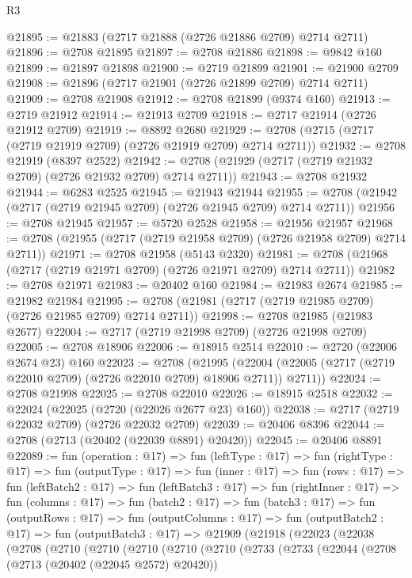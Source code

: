 \begin{lexlean}{R3}
\begin{coremodule}
@21895 := @21883 (@2717 @21888 (@2726 @21886 @2709) @2714 @2711)
@21896 := @2708 @21895
@21897 := @2708 @21886
@21898 := @9842 @160
@21899 := @21897 @21898
@21900 := @2719 @21899
@21901 := @21900 @2709
@21908 := @21896 (@2717 @21901 (@2726 @21899 @2709) @2714 @2711)
@21909 := @2708 @21908
@21912 := @2708 @21899 (@9374 @160)
@21913 := @2719 @21912
@21914 := @21913 @2709
@21918 := @2717 @21914 (@2726 @21912 @2709)
@21919 := @8892 @2680
@21929 := @2708 (@2715 (@2717 (@2719 @21919 @2709) (@2726 @21919 @2709) @2714 @2711))
@21932 := @2708 @21919 (@8397 @2522)
@21942 := @2708 (@21929 (@2717 (@2719 @21932 @2709) (@2726 @21932 @2709) @2714 @2711))
@21943 := @2708 @21932
@21944 := @6283 @2525
@21945 := @21943 @21944
@21955 := @2708 (@21942 (@2717 (@2719 @21945 @2709) (@2726 @21945 @2709) @2714 @2711))
@21956 := @2708 @21945
@21957 := @5720 @2528
@21958 := @21956 @21957
@21968 := @2708 (@21955 (@2717 (@2719 @21958 @2709) (@2726 @21958 @2709) @2714 @2711))
@21971 := @2708 @21958 (@5143 @2320)
@21981 := @2708 (@21968 (@2717 (@2719 @21971 @2709) (@2726 @21971 @2709) @2714 @2711))
@21982 := @2708 @21971
@21983 := @20402 @160
@21984 := @21983 @2674
@21985 := @21982 @21984
@21995 := @2708 (@21981 (@2717 (@2719 @21985 @2709) (@2726 @21985 @2709) @2714 @2711))
@21998 := @2708 @21985 (@21983 @2677)
@22004 := @2717 (@2719 @21998 @2709) (@2726 @21998 @2709)
@22005 := @2708 @18906
@22006 := @18915 @2514
@22010 := @2720 (@22006 @2674 @23) @160
@22023 := @2708
    (@21995 (@22004 (@22005 (@2717 (@2719 @22010 @2709) (@2726 @22010 @2709) @18906 @2711)) @2711))
@22024 := @2708 @21998
@22025 := @2708 @22010
@22026 := @18915 @2518
@22032 := @22024 (@22025 (@2720 (@22026 @2677 @23) @160))
@22038 := @2717 (@2719 @22032 @2709) (@2726 @22032 @2709)
@22039 := @20406 @8396
@22044 := @2708 (@2713 (@20402 (@22039 @8891) @20420))
@22045 := @20406 @8891
@22089 := fun (operation : @17) =>
  fun (leftType : @17) =>
  fun (rightType : @17) =>
  fun (outputType : @17) =>
  fun (inner : @17) =>
  fun (rows : @17) =>
  fun (leftBatch2 : @17) =>
  fun (leftBatch3 : @17) =>
  fun (rightInner : @17) =>
  fun (columns : @17) =>
  fun (batch2 : @17) =>
  fun (batch3 : @17) =>
  fun (outputRows : @17) =>
  fun (outputColumns : @17) =>
  fun (outputBatch2 : @17) =>
  fun (outputBatch3 : @17) =>
  @21909
    (@21918
      (@22023
        (@22038
          (@2708
            (@2710
              (@2710
                (@2710
                  (@2710
                    (@2710
                      (@2733
                        (@2733
                          (@22044
                            (@2708
                              (@2713 (@20402 (@22045 @2572) @20420))

\end{coremodule}
\end{lexlean}
